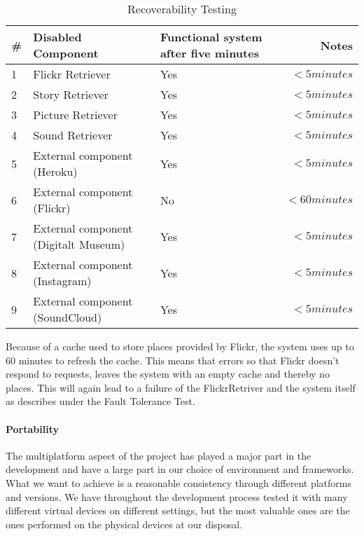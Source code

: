 \begin{table}[!htp]
\begin{center}
	\begin{tabular}{ | l | l | p{3.7cm} | r | }
	\hline
	\#	&Disabled Component	&Functional system  after five minutes	& Notes \\ \hline
	1	&Flickr Retriever		&Yes			& $<5 minutes$ \\ \hline
	2	&Story Retriever		&Yes			& $<5 minutes$\\ \hline
	3	&Picture Retriever	&Yes			& $<5 minutes$\\ \hline
	4	&Sound Retriever	&Yes			& $<5 minutes$\\ \hline
	5	&External component (Heroku)	&Yes			& $<5 minutes$\\ \hline
	6	&External component (Flickr)	&No			& $<60 minutes$\\ \hline
	7	&External component (Digitalt Museum)	&Yes		& $<5 minutes$\\ \hline
	8	&External component (Instagram)	&Yes			& $<5 minutes$\\ \hline
	9	&External component (SoundCloud)	&Yes			& $<5 minutes$\\ \hline
	 \hline
	 \end{tabular}
\end{center}
\caption{Recoverability Testing}
\label{tab:Recoverability Testing}
\end{table}

Because of a cache used to store places provided by Flickr, the system uses up to 60 minutes to refresh the cache. This means that errors so that Flickr doesn't respond to requests, leaves the system with an empty cache and thereby no places. This will again lead to a failure of the FlickrRetriver and the system itself as describes under the Fault Tolerance Test. 

\paragraph{Portability}

The multiplatform aspect of the project has played a major part in the development and have a large part in our choice of environment and frameworks. What we want to achieve is a reasonable consistency through different platforms and versions. We have throughout the development process tested it with many different virtual devices on different settings, but the most valuable ones are the ones performed on the physical devices at our disposal.\\

